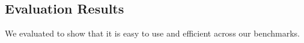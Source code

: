 
\subsection{\sys Evaluation Results}
\label{sec:results_evaluation}

We evaluated \sys to show that it is easy to use and efficient across our
benchmarks. %

%

